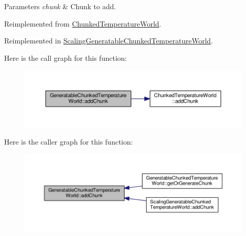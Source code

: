 \begin{DoxyParams}{Parameters}
{\em chunk} & Chunk to add. \\
\hline
\end{DoxyParams}


Reimplemented from \hyperlink{class_chunked_temperature_world_a5f9a3a143baf0c0238427926aef77f65}{Chunked\-Temperature\-World}.



Reimplemented in \hyperlink{class_scaling_generatable_chunked_temperature_world_a5ec1b1a2a5e058bf57bd7918fcc5a35b}{Scaling\-Generatable\-Chunked\-Temperature\-World}.



Here is the call graph for this function\-:
\nopagebreak
\begin{figure}[H]
\begin{center}
\leavevmode
\includegraphics[width=350pt]{class_generatable_chunked_temperature_world_af1a6752db0e722e8649ddb4c7e1ea8fa_cgraph}
\end{center}
\end{figure}




Here is the caller graph for this function\-:
\nopagebreak
\begin{figure}[H]
\begin{center}
\leavevmode
\includegraphics[width=350pt]{class_generatable_chunked_temperature_world_af1a6752db0e722e8649ddb4c7e1ea8fa_icgraph}
\end{center}
\end{figure}


